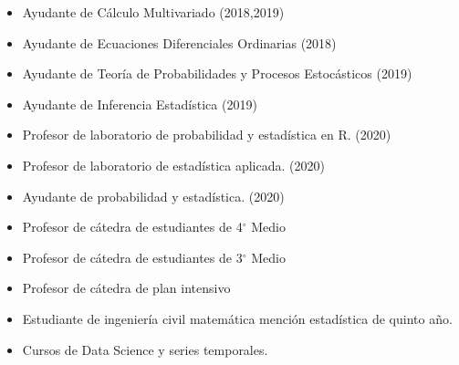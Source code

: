 \documentclass[10pt,letterpaper,ragged2e]{altacv}
\begin{document}
\begin{paracol}{2}


\begin{itemize}
\item Ayudante de Cálculo Multivariado (2018,2019)
\item Ayudante de Ecuaciones Diferenciales Ordinarias (2018)
\item Ayudante de Teoría de Probabilidades y Procesos Estocásticos (2019)
\item Ayudante de Inferencia Estadística (2019)
\end{itemize}
\divider
{}
\begin{itemize}
\item Profesor de laboratorio de probabilidad y estadística en R. (2020)
\item Profesor de laboratorio de estadística aplicada. (2020)
\item Ayudante de probabilidad y estadística. (2020)
\end{itemize}
\divider
{}
\begin{itemize}
\item Profesor de cátedra de estudiantes de 4$^\circ$ Medio 
\item Profesor de cátedra de estudiantes de 3$^\circ$ Medio
\item Profesor de cátedra de plan intensivo
\end{itemize}






\begin{itemize}
\item Estudiante de ingeniería civil matemática mención estadística de quinto año.
\end{itemize}
\divider

\begin{itemize}
\item Cursos de Data Science y series temporales.
\end{itemize}
\divider
\switchcolumn


\end{paracol}
\end{document}
